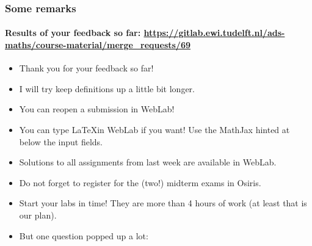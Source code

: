 

\begin{frame}
	\frametitle{Some remarks}
	\framesubtitle{Results of your feedback so far: \url{https://gitlab.ewi.tudelft.nl/ads-maths/course-material/merge_requests/69}}
	\begin{itemize}
		\item Thank you for your feedback so far!
		\item I will try keep definitions up a little bit longer.
		\item You can reopen a submission in WebLab!
			\pause
		\item You can type \LaTeX in WebLab if you want! Use the MathJax hinted at below the input fields.
		\item Solutions to all assignments from last week are available in WebLab.
			\pause
		\item Do not forget to register for the (two!) midterm exams in Osiris.
		\item Start your labs in time! They are more than 4 hours of work (at least that is our plan).
			\pause
		\item But one question popped up a lot:
	\end{itemize}
\end{frame}
